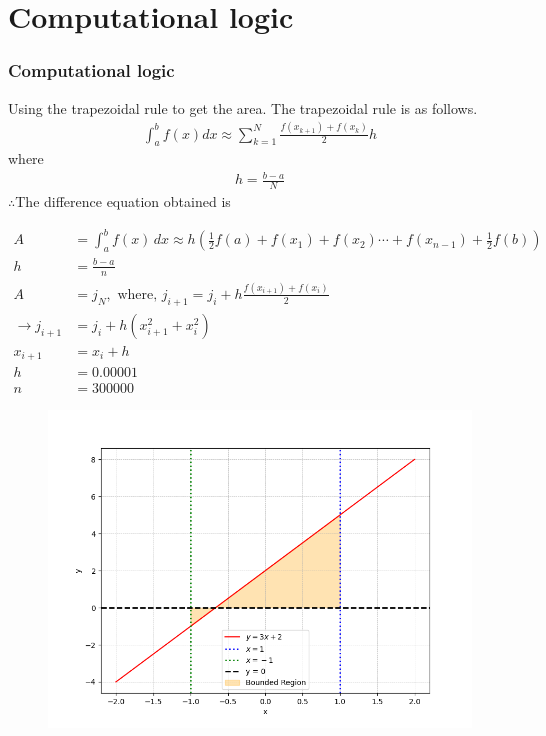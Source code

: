 \documentclass{beamer}
\providecommand{\brak}[1]{\ensuremath{\left(#1\right)}}
\theoremstyle{remark}
\numberwithin{equation}{section}
\begin{document}
\section{Computational logic}
\begin{frame}[fragile]
    \frametitle{Computational logic}
    Using the trapezoidal rule to get the area. The trapezoidal rule is as follows.
\begin{align}
    \int^{b}_{a} f\brak{x}dx\approx \sum^{N}_{k=1}\frac{f\brak{x_{k+1}}+f\brak{x_{k}}}{2}h
\end{align}
where
\begin{align}
    h=\frac{b-a}{N}
\end{align}
$\therefore$The difference equation obtained is\\
\end{frame}
\begin{frame}[fragile]
    \begin{align}
    A &= \int_a^b f\brak{x}\, dx \approx h\brak{\frac{1}{2}f\brak{a} + f\brak{x_1} + f\brak{x_2} \cdots + f\brak{x_{n-1}} + \frac{1}{2}f\brak{b}}\\
     h &= \frac{b-a}{n}\\
    A &= j_N, \text{ where, } j_{i + 1} = j_i + h\frac{f\brak{x_{i+1}} + f\brak{x_i}}{2}\\ 
        \xrightarrow{} j_{i + 1} &= j_i + h\brak{{x_{i+1}^2}+{x_{i}^2}}\\
    x_{i+1} &= x_i + h\\
    h&=0.00001\\
    n&=300000
    \end{align}
\end{frame}
\begin{frame}[fragile]
    \begin{figure}[h]
    \centering
    \includegraphics[width=\columnwidth]{figs/fig.png}
 \end{figure}
\end{frame}
\end{document}
